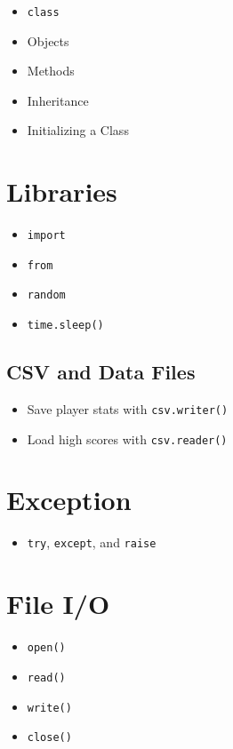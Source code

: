 \documentclass{article}
\begin{document}
\begin{itemize}
    \item \verb|class|
    \item Objects
    \item Methods
    \item Inheritance
    \item Initializing a Class
\end{itemize}

\section{Libraries}

\begin{itemize}
    \item \verb|import|
    \item \verb|from|
    \item \verb|random|
    \item \verb|time.sleep()|
\end{itemize}
\subsection{CSV and Data Files}
\begin{itemize}
    \item Save player stats with \verb|csv.writer()|
    \item Load high scores with \verb|csv.reader()|
\end{itemize}

\section{Exception}

\begin{itemize}
    \item \verb|try|, \verb|except|, and \verb|raise|
\end{itemize}

\section{File I/O}

\begin{itemize}
    \item \verb|open()|
    \item \verb|read()|
    \item \verb|write()|
    \item \verb|close()|
\end{itemize}
\end{document}
